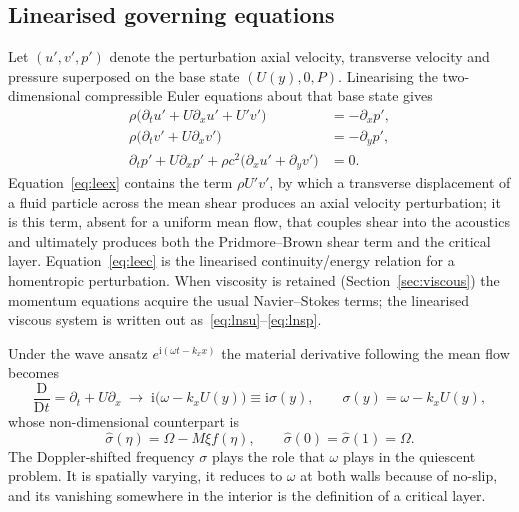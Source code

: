 \documentclass[11pt,a4paper]{article}
\newcommand{\Om}{\Omega}
\newcommand{\ii}{\mathrm{i}}
\newcommand{\sig}{\hat\sigma}
\theoremstyle{plain}
\theoremstyle{remark}
\begin{document}
\subsection{Linearised governing equations}
Let $(u',v',p')$ denote the perturbation axial velocity, transverse velocity and pressure superposed on
the base state $(U(y),0,P)$. Linearising the two-dimensional compressible Euler equations about that
base state gives
\begin{align}
\rho\bigl(\partial_tu'+U\partial_xu'+U'v'\bigr)&=-\partial_xp',
\label{eq:leex}\\[2pt]
\rho\bigl(\partial_tv'+U\partial_xv'\bigr)&=-\partial_yp',
\label{eq:leey}\\[2pt]
\partial_tp'+U\partial_xp'+\rho c^2\bigl(\partial_xu'+\partial_yv'\bigr)&=0 .
\label{eq:leec}
\end{align}
Equation~\eqref{eq:leex} contains the term $\rho U'v'$, by which a transverse displacement of a fluid
particle across the mean shear produces an axial velocity perturbation; it is this term, absent for a
uniform mean flow, that couples shear into the acoustics and ultimately produces both the
Pridmore--Brown shear term and the critical layer. Equation~\eqref{eq:leec} is the linearised
continuity/energy relation for a homentropic perturbation. When viscosity is retained
(Section~\ref{sec:viscous}) the momentum equations acquire the usual Navier--Stokes terms; the
linearised viscous system is written out as~\eqref{eq:lnsu}--\eqref{eq:lnsp}.

Under the wave ansatz $e^{\ii(\omega t-k_xx)}$ the material derivative following the mean flow becomes
\begin{equation}
\frac{\mathrm{D}}{\mathrm{D}t}=\partial_t+U\partial_x\;\longrightarrow\;\ii\bigl(\omega-k_xU(y)\bigr)
\equiv\ii\sigma(y),\qquad
\sigma(y)=\omega-k_xU(y),
\label{eq:sigmadef}
\end{equation}
whose non-dimensional counterpart is
\begin{equation}
\sig(\eta)=\Om-M\xi f(\eta),\qquad \sig(0)=\sig(1)=\Om .
\label{eq:sighat}
\end{equation}
The Doppler-shifted frequency $\sigma$ plays the role that $\omega$ plays in the quiescent problem. It
is spatially varying, it reduces to $\omega$ at both walls because of no-slip, and its vanishing
somewhere in the interior is the definition of a critical layer.
\end{document}
